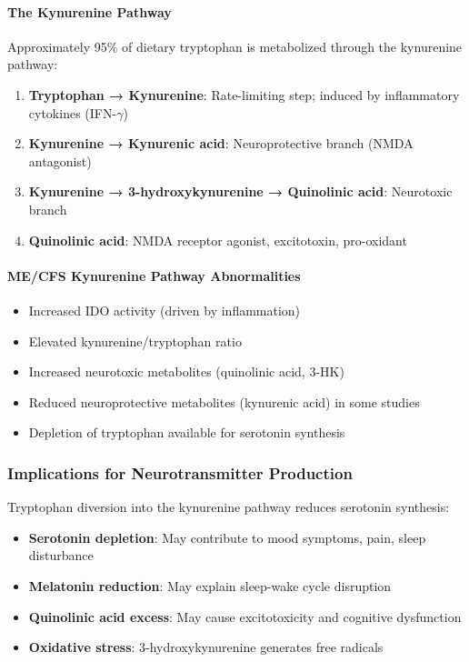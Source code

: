 \paragraph{The Kynurenine Pathway}
Approximately 95\% of dietary tryptophan is metabolized through the kynurenine pathway:

\begin{enumerate}
    \item \textbf{Tryptophan → Kynurenine}: Rate-limiting step; induced by inflammatory cytokines (IFN-$\gamma$)
    \item \textbf{Kynurenine → Kynurenic acid}: Neuroprotective branch (NMDA antagonist)
    \item \textbf{Kynurenine → 3-hydroxykynurenine → Quinolinic acid}: Neurotoxic branch
    \item \textbf{Quinolinic acid}: NMDA receptor agonist, excitotoxin, pro-oxidant
\end{enumerate}

\paragraph{ME/CFS Kynurenine Pathway Abnormalities}
\begin{itemize}
    \item Increased IDO activity (driven by inflammation)
    \item Elevated kynurenine/tryptophan ratio
    \item Increased neurotoxic metabolites (quinolinic acid, 3-HK)
    \item Reduced neuroprotective metabolites (kynurenic acid) in some studies
    \item Depletion of tryptophan available for serotonin synthesis
\end{itemize}

\subsubsection{Implications for Neurotransmitter Production}

Tryptophan diversion into the kynurenine pathway reduces serotonin synthesis:

\begin{itemize}
    \item \textbf{Serotonin depletion}: May contribute to mood symptoms, pain, sleep disturbance
    \item \textbf{Melatonin reduction}: May explain sleep-wake cycle disruption
    \item \textbf{Quinolinic acid excess}: May cause excitotoxicity and cognitive dysfunction
    \item \textbf{Oxidative stress}: 3-hydroxykynurenine generates free radicals
\end{itemize}

